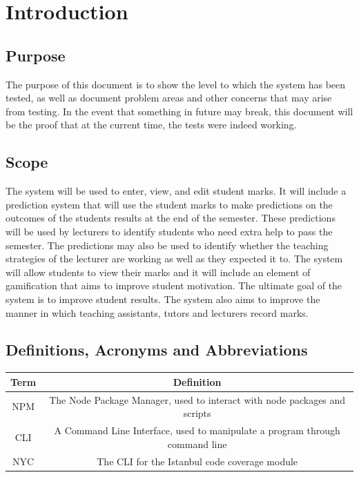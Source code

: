 \documentclass[a4paper,12pt]{article}
\begin{document}
    \tableofcontents
    
    \pagebreak
    
    \section{Introduction}
    	
        \subsection{Purpose}
        
        The purpose of this document is to show the level to which the system has been tested, as well as document problem areas and other concerns that may arise from testing. In the event that something in future may break, this document will be the proof that at the current time, the tests were indeed working.
        
        \subsection{Scope}
        
       The system will be used to enter, view, and edit student marks. It will include a prediction system that will use the student marks to make predictions on the outcomes of the students results at the end of the semester. These predictions will be used by lecturers to identify students who need extra help to pass the semester. The predictions may also be used to identify whether the teaching strategies of the lecturer are working as well as they expected it to. The system will allow students to view their marks and it will include an element of gamification that aims to improve student motivation. The ultimate goal of the system is to improve student results. The system also aims to improve the manner in which teaching assistants, tutors and lecturers record marks.
        
        \subsection{Definitions, Acronyms and Abbreviations}
        
       \begin{tabular}{ |c|c| } 
        	\hline
        	Term & Definition \\
        	\hline
        	NPM & The Node Package Manager, used to interact with node packages and scripts\\
        	\hline
        	CLI & A Command Line Interface, used to manipulate a program through command line\\
        	\hline
        	NYC & The CLI for the Istanbul code coverage module\\
        	\hline
        \end{tabular}
    
\end{document}
